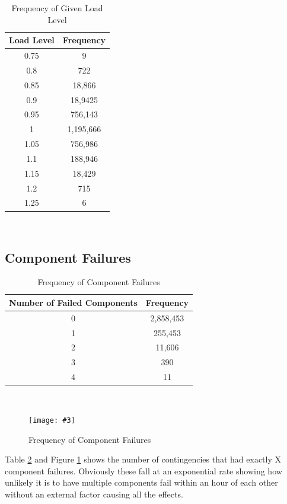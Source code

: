 \documentclass[a4paper,oneside,12pt]{report}
\newcommand{\image}[3] {
  \begin{figure}
    \begin{center}
      \texttt{[image: \#3]}
      \caption{#2}
      \label{#1}
    \end{center}
  \end{figure}
}
\begin{document}
\begin{table}[htbp]
\caption{Frequency of Given Load Level}
\label{table_contingency_load_level}
\centering
\begin{tabular}{c||c}
\bfseries Load Level & \bfseries Frequency \\
\hline \hline
0.75 & 9 \\ 
0.8 & 722 \\ 
0.85 & 18,866 \\ 
0.9 & 18,9425 \\ 
0.95 & 756,143 \\ 
1 & 1,195,666 \\ 
1.05 & 756,986 \\ 
1.1 & 188,946 \\ 
1.15 & 18,429 \\ 
1.2 & 715 \\ 
1.25 & 6 \\ 
\hline
\end{tabular}\\
\end{table}

\subsection{Component Failures}

\begin{table}[htbp]
\caption{Frequency of Component Failures}
\label{table_contingency_component_failure}
\centering
\begin{tabular}{c||c}
\bfseries Number of Failed Components & \bfseries Frequency \\
\hline \hline
0 & 2,858,453 \\ 
1 & 255,453 \\ 
2 & 11,606 \\ 
3 & 390 \\ 
4 & 11 \\ 
\hline
\end{tabular}\\
\end{table}

\image{contingencyfailfreq}{Frequency of Component Failures}{contingencyfailfreq.png}

Table \ref{table_contingency_component_failure} and Figure \ref{contingencyfailfreq} shows the number of contingencies that had exactly X component failures. Obviously these fall at an exponential rate showing how unlikely it is to have multiple components fail within an hour of each other without an external factor causing all the effects. 
\end{document}
